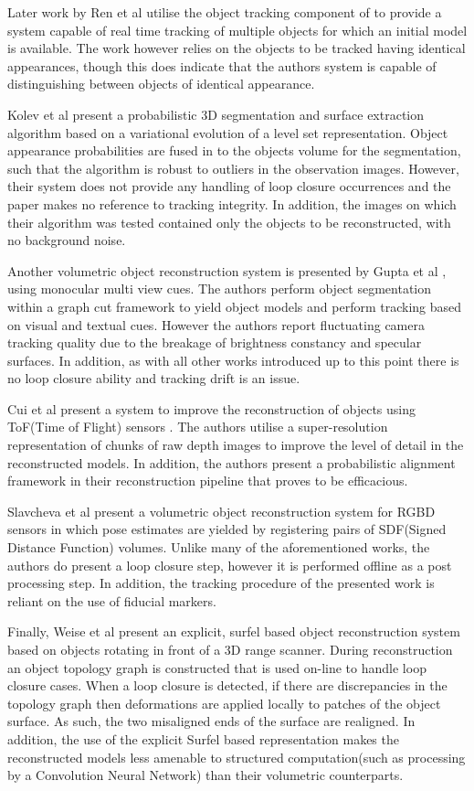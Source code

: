 Later work by Ren et al \cite{Ren2014} utilise the object tracking component of \cite{Ren2013} to provide a system capable of real time tracking 
of multiple objects for which an initial model is available. The work however relies on the objects to be tracked having identical appearances, 
though this does indicate that the authors system is capable of distinguishing between objects of identical appearance.

Kolev et al present a probabilistic 3D segmentation and surface extraction algorithm \cite{Kolev2006} based on a variational evolution of a level 
set representation. Object appearance probabilities are fused in to the objects volume for the segmentation, such that the algorithm is robust to 
outliers in the observation images. However, their system does not provide any handling of 
loop closure occurrences and the paper makes no reference to tracking integrity. In addition, the images on which their algorithm was tested 
contained only the objects to be reconstructed, with no background noise.

Another volumetric object reconstruction system is presented by Gupta et al \cite{Gupta2016}, using monocular multi view cues. The authors 
perform object segmentation within a graph cut framework to yield object models and perform tracking based on visual and textual cues. 
However the authors report fluctuating camera tracking quality due to the breakage of brightness constancy and specular surfaces. In addition, 
as with all other works introduced up to this point there is no loop closure ability and tracking drift is an issue.

Cui et al present a system to improve the reconstruction of objects using ToF(Time of Flight) sensors \cite{Cui2013}. The authors utilise a super-resolution 
representation of chunks of raw depth images to improve the level of detail in the reconstructed models. In addition, the authors present a probabilistic 
alignment framework in their reconstruction pipeline that proves to be efficacious.

Slavcheva et al present a volumetric object reconstruction system for RGBD sensors in which pose estimates are yielded by registering pairs of 
SDF(Signed Distance Function) volumes. Unlike many of the aforementioned works, the authors do present a loop closure step, however it is 
performed offline as a post processing step. In addition, the tracking procedure of the presented work is reliant on the use of fiducial markers.

Finally, Weise et al present an explicit, surfel based object reconstruction system \cite{Weise2009} based on objects rotating in front of a 3D 
range scanner. During reconstruction an object topology graph is constructed that is used on-line to handle loop closure cases. When a loop 
closure is detected, if there are discrepancies in the topology graph then deformations are applied locally to patches of the object surface. As 
such, the two misaligned ends of the surface are realigned. In addition, the use of the explicit Surfel based representation makes the reconstructed models less amenable to structured  computation(such as processing by a Convolution Neural Network) than their volumetric counterparts. 